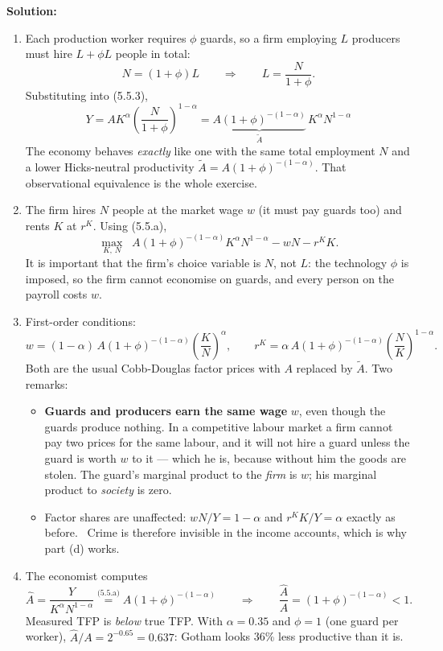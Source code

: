 \documentclass[12pt, letterpaper]{article}
\begin{document}
\begin{tcolorbox}[oddbox,title={Problem 5.5 \quad Sources of TFP}]
\textbf{Solution:}
\begin{enumerate}

\item Each production worker requires $\phi$ guards, so a firm employing $L$ producers must
hire $L+\phi L$ people in total:
\[
N=(1+\phi)L
\qquad\Longrightarrow\qquad
L=\frac{N}{1+\phi} .
\]
Substituting into (5.5.3),
\[
\boxed{\;Y=AK^{\alpha}\left(\frac{N}{1+\phi}\right)^{1-\alpha}
=\underbrace{A(1+\phi)^{-(1-\alpha)}}_{\textstyle \tilde A}\,K^{\alpha}N^{1-\alpha}\;}
\tag{5.5.a}
\]
The economy behaves \emph{exactly} like one with the same total employment $N$ and a lower
Hicks-neutral productivity $\tilde A=A(1+\phi)^{-(1-\alpha)}$. That observational
equivalence is the whole exercise.

\item The firm hires $N$ people at the market wage $w$ (it must pay guards too) and rents
$K$ at $r^K$. Using (5.5.a),
\[
\max_{K,\,N}\;\;
A(1+\phi)^{-(1-\alpha)}K^{\alpha}N^{1-\alpha}-wN-r^{K}K .
\]
It is important that the firm's choice variable is $N$, not $L$: the technology $\phi$ is
imposed, so the firm cannot economise on guards, and every person on the payroll costs $w$.

\item First-order conditions:
\[
\boxed{w=(1-\alpha)\,A(1+\phi)^{-(1-\alpha)}\left(\frac{K}{N}\right)^{\alpha}},
\qquad
\boxed{r^{K}=\alpha\,A(1+\phi)^{-(1-\alpha)}\left(\frac{N}{K}\right)^{1-\alpha}} .
\]
Both are the usual Cobb-Douglas factor prices with $A$ replaced by $\tilde A$. Two remarks:
\begin{itemize}[leftmargin=1.3em,itemsep=2pt,topsep=3pt]
\item \textbf{Guards and producers earn the same wage} $w$, even though the guards produce
      nothing. In a competitive labour market a firm cannot pay two prices for the same
      labour, and it will not hire a guard unless the guard is worth $w$ to it --- which he
      is, because without him the goods are stolen. The guard's marginal product to the
      \emph{firm} is $w$; his marginal product to \emph{society} is zero.
\item Factor shares are unaffected: $wN/Y=1-\alpha$ and $r^KK/Y=\alpha$ exactly as before.
      \checkmark\ Crime is therefore invisible in the income accounts, which is why part (d)
      works.
\end{itemize}

\item The economist computes
\[
\hat A=\frac{Y}{K^{\alpha}N^{1-\alpha}}
\stackrel{\text{(5.5.a)}}{=}A(1+\phi)^{-(1-\alpha)}
\qquad\Longrightarrow\qquad
\boxed{\frac{\hat A}{A}=(1+\phi)^{-(1-\alpha)}<1} .
\]
Measured TFP is \emph{below} true TFP. With $\alpha=0.35$ and $\phi=1$ (one guard per
worker), $\hat A/A=2^{-0.65}=0.637$: Gotham looks 36\% less productive than it is.
\checkmark


\end{enumerate}
\end{tcolorbox}
\end{document}
